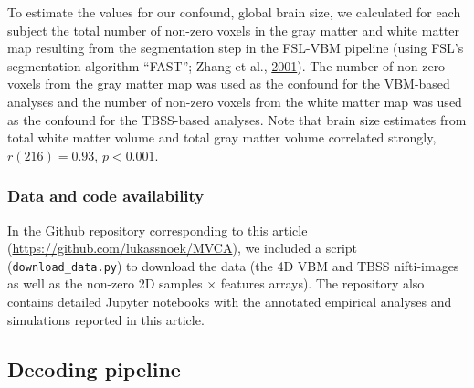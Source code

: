 \documentclass[11pt,american,a4paper,oneside,]{memoir} %
\begin{document}
To estimate the values for our confound, global brain size, we calculated for each subject the total number of non-zero voxels in the gray matter and white matter map resulting from the segmentation step in the FSL-VBM pipeline (using FSL's segmentation algorithm ``FAST''; Zhang et al., \protect\hyperlink{ref-Zhang2001-wa}{2001}). The number of non-zero voxels from the gray matter map was used as the confound for the VBM-based analyses and the number of non-zero voxels from the white matter map was used as the confound for the TBSS-based analyses. Note that brain size estimates from total white matter volume and total gray matter volume correlated strongly, \(r (216) = 0.93\), \(p < 0.001\).

\hypertarget{confounds-decoding-methods-data-data-and-code}{%
\subsubsection{Data and code availability}\label{confounds-decoding-methods-data-data-and-code}}

In the Github repository corresponding to this article (\url{https://github.com/lukassnoek/MVCA}), we included a script (\texttt{download\_data.py}) to download the data (the 4D VBM and TBSS nifti-images as well as the non-zero 2D samples × features arrays). The repository also contains detailed Jupyter notebooks with the annotated empirical analyses and simulations reported in this article.

\hypertarget{confounds-decoding-methods-pipeline}{%
\subsection{Decoding pipeline}\label{confounds-decoding-methods-pipeline}}
\end{document}
